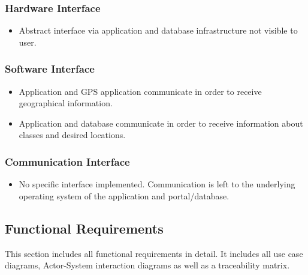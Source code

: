 \documentclass{article}
\begin{document}
 		\subsubsection{Hardware Interface}
 		\begin{itemize}
 		\item Abstract interface via application and database infrastructure not visible to user.\newline
 		\end{itemize}
 		
 		\subsubsection{Software Interface}
 		\begin{itemize}
 		\item Application and GPS application communicate in order to receive geographical information. 			\item Application and database communicate in order to receive information about classes and desired locations.\newline
 		\end{itemize}
 		
 		\subsubsection{Communication Interface}
 		\begin{itemize}
 		\item No specific interface implemented. Communication is left to the underlying operating system of the application and portal/database.\newline
 		\end{itemize}
 
	
	\subsection{Functional Requirements}
	This section includes all functional requirements in detail. It includes all use case diagrams, Actor-System interaction diagrams as well as a traceability matrix.	
\end{document}
